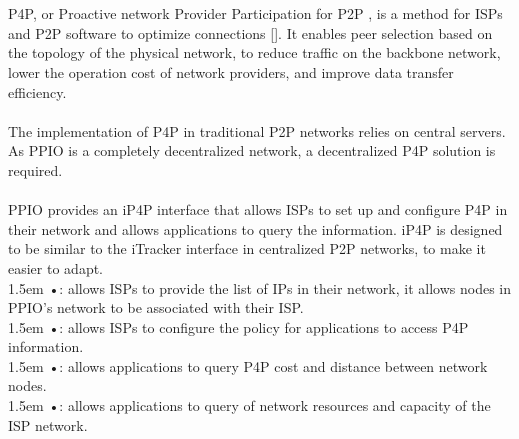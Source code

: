 \documentclass[10pt,a4paper]{article}
\newcommand\hl{\bgroup\markoverwith
  {\textcolor{lightgray}{\rule[-.5ex]{.1pt}{2.5ex}}}\ULon}
\begin{document}
 \vspace{-0.5em}
  \\ \\ P4P, or Proactive network Provider Participation for P2P \cite{article17}, is a method for ISPs and P2P software to optimize connections []. It enables peer selection based on the topology of the physical network, to reduce traffic on the backbone network, lower the operation cost of network providers, and improve data transfer efficiency. 
  \vspace{-0.5em}
  \\ \\The implementation of P4P in traditional P2P networks relies on central servers. As PPIO is a completely decentralized network, a decentralized P4P solution is required.
  \vspace{-0.5em}
    \\ \\PPIO provides an iP4P interface that allows ISPs to set up and configure P4P in their network and allows applications to query the information. iP4P is designed to be similar to the iTracker interface \cite{article17} in centralized P2P networks, to make it easier to adapt.
    \vspace{-0.8em}
\\

\hangindent 1.5em
\noindent   
•: allows ISPs to provide the list of IPs in their network, it allows nodes in PPIO’s network to be associated with their ISP.
\vspace{-0.8em}                                                      %
\\

\hangindent 1.5em
\noindent   
•: allows ISPs to configure the policy for applications to access P4P information.
\vspace{-0.8em}
\\

\hangindent 1.5em
\noindent   
•: allows applications to query P4P cost and distance between network nodes.
\vspace{-0.8em}
\\

\hangindent 1.5em
\noindent   
•: allows applications to query of network resources and capacity of the ISP network.
\vspace{-0.8em}
\\
\end{document}
